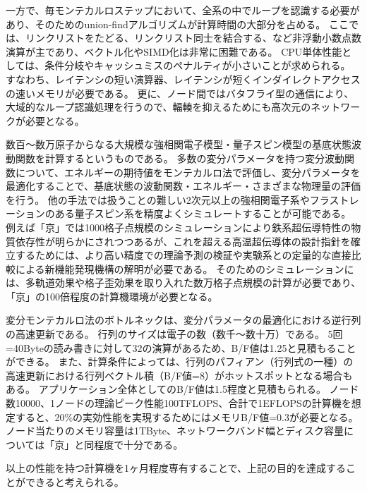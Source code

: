 一方で、毎モンテカルロステップにおいて、全系の中でループを認識する必要があり、そのためのunion-findアルゴリズムが計算時間の大部分を占める。
ここでは、リンクリストをたどる、リンクリスト同士を結合する、など非浮動小数点数演算が主であり、ベクトル化やSIMD化は非常に困難である。
CPU単体性能としては、条件分岐やキャッシュミスのペナルティが小さいことが求められる。
すなわち、レイテンシの短い演算器、レイテンシが短くインダイレクトアクセスの速いメモリが必要である。
更に、ノード間ではバタフライ型の通信により、大域的なループ認識処理を行うので、輻輳を抑えるためにも高次元のネットワークが必要となる。


\label{sec:4-2_要求性能_変分MC}
数百～数万原子からなる大規模な強相関電子模型・量子スピン模型の基底状態波動関数を計算するというものである。
多数の変分パラメータを持つ変分波動関数について、エネルギーの期待値をモンテカルロ法で評価し、変分パラメータを最適化することで、基底状態の波動関数・エネルギー・さまざまな物理量の評価を行う。
他の手法では扱うことの難しい2次元以上の強相関電子系やフラストレーションのある量子スピン系を精度よくシミュレートすることが可能である。
例えば「京」では1000格子点規模のシミュレーションにより鉄系超伝導特性の物質依存性が明らかにされつつあるが、これを超える高温超伝導体の設計指針を確立するためには、より高い精度での理論予測の検証や実験系との定量的な直接比較による新機能発現機構の解明が必要である。
そのためのシミュレーションには、多軌道効果や格子歪効果を取り入れた数万格子点規模の計算が必要であり、「京」の100倍程度の計算機環境が必要となる。

変分モンテカルロ法のボトルネックは、変分パラメータの最適化における逆行列の高速更新である。
行列のサイズは電子の数（数千〜数十万）である。
5回=40Byteの読み書きに対して32の演算があるため、B/F値は1.25と見積もることができる。
また、計算条件によっては、行列のパフィアン（行列式の一種）の高速更新における行列ベクトル積（B/F値=8）がホットスポットとなる場合もある。
アプリケーション全体としてのB/F値は1.5程度と見積もられる。
ノード数10000、1ノードの理論ピーク性能100TFLOPS、合計で1EFLOPSの計算機を想定すると、20\%の実効性能を実現するためにはメモリB/F値=0.3が必要となる。
ノード当たりのメモリ容量は1TByte、ネットワークバンド幅とディスク容量については「京」と同程度で十分である。

以上の性能を持つ計算機を1ヶ月程度専有することで、上記の目的を達成することができると考えられる。


